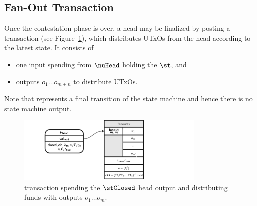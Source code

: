 \subsection{Fan-Out Transaction}\label{sec:fanout-tx}

Once the contestation phase is over, a head may be finalized by posting a
\mtxFanout{} transaction (see Figure~\ref{fig:fanoutTx}), which
distributes UTxOs from the head according to the latest state. It consists of
\begin{itemize}
  \item one input spending from $\nuHead$ holding the $\st$, and
  \item outputs $o_{1} \dots o_{m+n}$ to distribute UTxOs.
\end{itemize}

Note that \mtxFanout{} represents a final transition of the state machine and
hence there is no state machine output.

\begin{figure}
  \centering
  \includegraphics[width=0.8\textwidth]{Hydra/Protocol/Figures/fanoutTx.pdf}
  \caption{\mtxFanout{} transaction spending the $\stClosed$ head output and
	distributing funds with outputs $o_{1} \dots o_{m}$.}\label{fig:fanoutTx}
\end{figure}

